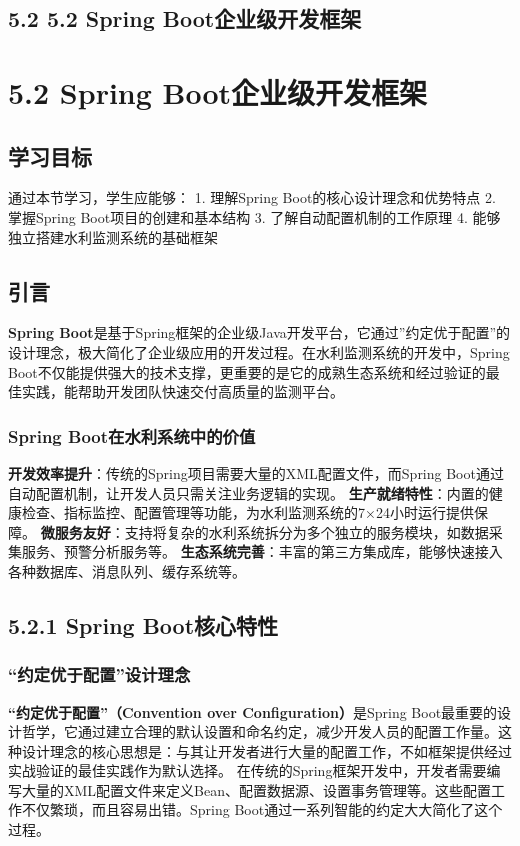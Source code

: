 \subsection{5.2 5.2 Spring Boot企业级开发框架}\label{spring-bootux4f01ux4e1aux7ea7ux5f00ux53d1ux6846ux67b6} \section{5.2 Spring Boot企业级开发框架}\label{spring-bootux4f01ux4e1aux7ea7ux5f00ux53d1ux6846ux67b6-1} \subsection{学习目标}\label{ux5b66ux4e60ux76eeux6807} 通过本节学习，学生应能够： 1. 理解Spring Boot的核心设计理念和优势特点 2. 掌握Spring Boot项目的创建和基本结构 3. 了解自动配置机制的工作原理 4. 能够独立搭建水利监测系统的基础框架 \subsection{引言}\label{ux5f15ux8a00} \textbf{Spring Boot}是基于Spring框架的企业级Java开发平台，它通过''约定优于配置''的设计理念，极大简化了企业级应用的开发过程。在水利监测系统的开发中，Spring Boot不仅能提供强大的技术支撑，更重要的是它的成熟生态系统和经过验证的最佳实践，能帮助开发团队快速交付高质量的监测平台。 \subsubsection{Spring Boot在水利系统中的价值}\label{spring-bootux5728ux6c34ux5229ux7cfbux7edfux4e2dux7684ux4ef7ux503c} \textbf{开发效率提升}：传统的Spring项目需要大量的XML配置文件，而Spring Boot通过自动配置机制，让开发人员只需关注业务逻辑的实现。 \textbf{生产就绪特性}：内置的健康检查、指标监控、配置管理等功能，为水利监测系统的7×24小时运行提供保障。 \textbf{微服务友好}：支持将复杂的水利系统拆分为多个独立的服务模块，如数据采集服务、预警分析服务等。 \textbf{生态系统完善}：丰富的第三方集成库，能够快速接入各种数据库、消息队列、缓存系统等。 \subsection{5.2.1 Spring Boot核心特性}\label{spring-bootux6838ux5fc3ux7279ux6027} \subsubsection{``约定优于配置''设计理念}\label{ux7ea6ux5b9aux4f18ux4e8eux914dux7f6eux8bbeux8ba1ux7406ux5ff5} \textbf{``约定优于配置''（Convention over Configuration）}是Spring Boot最重要的设计哲学，它通过建立合理的默认设置和命名约定，减少开发人员的配置工作量。这种设计理念的核心思想是：与其让开发者进行大量的配置工作，不如框架提供经过实战验证的最佳实践作为默认选择。 在传统的Spring框架开发中，开发者需要编写大量的XML配置文件来定义Bean、配置数据源、设置事务管理等。这些配置工作不仅繁琐，而且容易出错。Spring Boot通过一系列智能的约定大大简化了这个过程。 